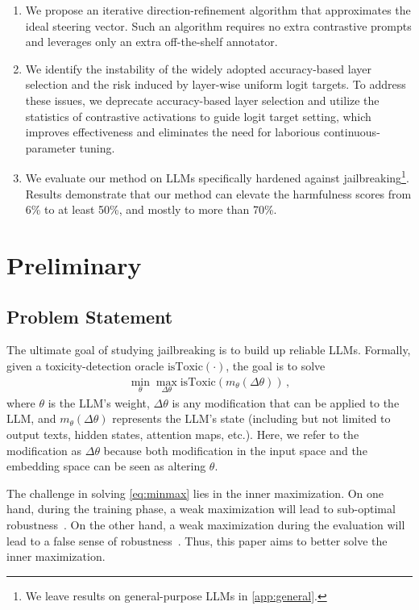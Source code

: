 \documentclass{article}
\theoremstyle{plain}
\theoremstyle{definition}
\theoremstyle{remark}
\begin{document}
\begin{enumerate}
	\item We propose an iterative direction-refinement algorithm that approximates the ideal steering vector. Such an algorithm requires no extra contrastive prompts and leverages only an extra off-the-shelf annotator.
	
	\item We identify the instability of the widely adopted accuracy-based layer selection and the risk induced by layer-wise uniform logit targets. To address these issues, we deprecate accuracy-based layer selection and utilize the statistics of contrastive activations to guide logit target setting, which improves effectiveness and eliminates the need for laborious continuous-parameter tuning.
	
	\item We evaluate our method on LLMs specifically hardened against jailbreaking\footnote{We leave results on general-purpose LLMs in \cref{app:general}.}. Results demonstrate that our method can elevate the harmfulness scores from 6\% to at least 50\%, and mostly to more than 70\%.
\end{enumerate}




\section{Preliminary}

\subsection{Problem Statement}

The ultimate goal of studying jailbreaking is to build up reliable LLMs. Formally, given a toxicity-detection oracle $\text{isToxic}(\cdot)$, the goal is to solve
\begin{align}
	\min_{\theta}\max_{\Delta\theta}\text{isToxic}(m_{\theta}(\Delta\theta))\,,\label{eq:minmax}
\end{align}
where $\theta$ is the LLM's weight, $\Delta\theta$ is any modification that can be applied to the LLM, and $m_{\theta}(\Delta\theta)$ represents the LLM's state (including but not limited to output texts, hidden states, attention maps, etc.). Here, we refer to the modification as $\Delta\theta$ because both modification in the input space and the embedding space can be seen as altering $\theta$.

The challenge in solving \cref{eq:minmax} lies in the inner maximization. On one hand, during the training phase, a weak maximization will lead to sub-optimal robustness~\cite{pgd}. On the other hand, a weak maximization during the evaluation will lead to a false sense of robustness~\cite{obfCarlini}. Thus, this paper aims to better solve the inner maximization.
\end{document}
